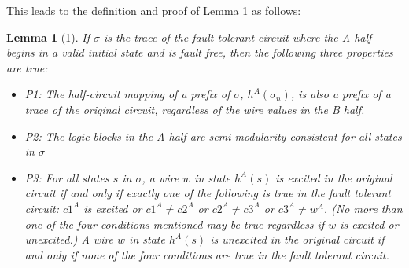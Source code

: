 \documentclass[12pt]{report}
\newtheorem*{lemma}{Lemma}
\begin{document}
This leads to the definition and proof of Lemma 1 as follows:

\begin{lemma}[1]
If $\sigma$ is the trace of the fault tolerant circuit where the A half begins in a valid initial state and is fault free, then the following three properties are true:
\begin{itemize}
\item P1: The half-circuit mapping of a prefix of $\sigma$, $h^{A}(\sigma_n)$, is also a prefix of a trace of the original circuit, regardless of the wire values in the B half.
\item P2: The logic blocks in the A half are semi-modularity consistent for all states in $\sigma$
\item P3: For all states $s$ in $\sigma$, a wire $w$ in state $h^A(s)$ is excited in the original circuit if and only if exactly one of the following is true in the fault tolerant circuit: $c1^A$ is excited or $c1^{A}\neq c2^{A}$ or $c2^{A}\neq c3^A$ or $c3^{A}\neq w^A$.  (No more than one of the four conditions mentioned may be true regardless if $w$ is excited or unexcited.)  A wire $w$ in state $h^A(s)$ is unexcited in the original circuit if and only if none of the four conditions are true in the fault tolerant circuit.
\end{itemize}
 



\end{lemma}
\end{document}
